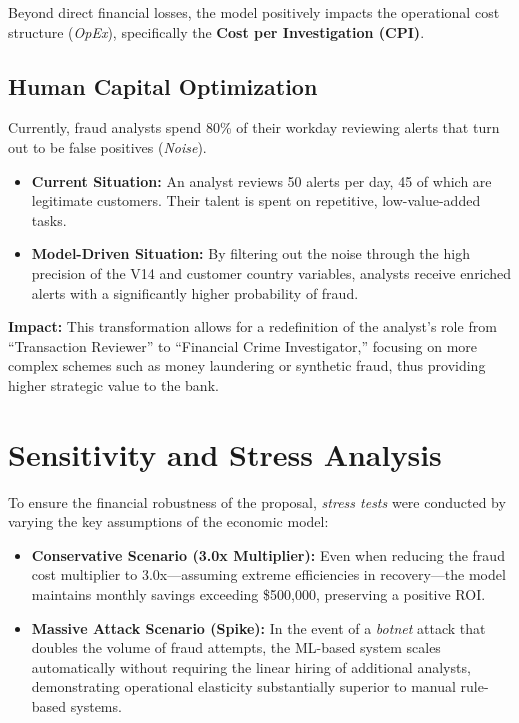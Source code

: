 \documentclass[12pt,a4paper]{report}
\begin{document}
Beyond direct financial losses, the model positively impacts the operational cost structure (\textit{OpEx}), specifically the \textbf{Cost per Investigation (CPI)}.

\subsection{Human Capital Optimization}

Currently, fraud analysts spend 80\% of their workday reviewing alerts that turn out to be false positives (\textit{Noise}).

\begin{itemize}
    \item \textbf{Current Situation:} An analyst reviews 50 alerts per day, 45 of which are legitimate customers. Their talent is spent on repetitive, low-value-added tasks.
    \item \textbf{Model-Driven Situation:} By filtering out the noise through the high precision of the V14 and customer country variables, analysts receive enriched alerts with a significantly higher probability of fraud.
\end{itemize}

\textbf{Impact:} This transformation allows for a redefinition of the analyst's role from \textquotedblleft Transaction Reviewer\textquotedblright{} to \textquotedblleft Financial Crime Investigator,\textquotedblright{} focusing on more complex schemes such as money laundering or synthetic fraud, thus providing higher strategic value to the bank.

\section{Sensitivity and Stress Analysis}

To ensure the financial robustness of the proposal, \textit{stress tests} were conducted by varying the key assumptions of the economic model:

\begin{itemize}
    \item \textbf{Conservative Scenario (3.0x Multiplier):}  
    Even when reducing the fraud cost multiplier to 3.0x—assuming extreme efficiencies in recovery—the model maintains monthly savings exceeding \$500,000, preserving a positive ROI.
    
    \item \textbf{Massive Attack Scenario (Spike):}  
    In the event of a \textit{botnet} attack that doubles the volume of fraud attempts, the ML-based system scales automatically without requiring the linear hiring of additional analysts, demonstrating operational elasticity substantially superior to manual rule-based systems.
\end{itemize}
\end{document}
